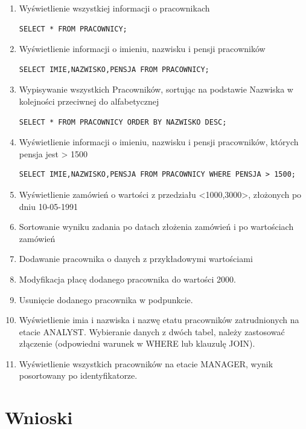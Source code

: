 \documentclass[a4paper, 10pt]{article}
\begin{document}
\begin{enumerate}

\item  Wyświetlienie wszystkiej informacji o pracownikach 
\begin{lstlisting}[style=SQL, caption=\textit{Wyświetlenie informacji o pracownikach}]
SELECT * FROM PRACOWNICY;
\end{lstlisting}

\item Wyświetlienie informacji o imieniu, nazwisku i pensji pracowników
\begin{lstlisting}[style=SQL, caption=\textit{Wyświetlenie imion, nazwisk i pensji pracowników}]
SELECT IMIE,NAZWISKO,PENSJA FROM PRACOWNICY;
\end{lstlisting}

\item Wypisywanie wszystkich Pracowników, sortując na podstawie Nazwiska w kolejności przeciwnej do alfabetycznej
\begin{lstlisting}[style=SQL, caption=\textit{Wypisywanie pracowników na podstawie nazwisk w kolejności przeciwnej do algabetycznej}]
SELECT * FROM PRACOWNICY ORDER BY NAZWISKO DESC;
\end{lstlisting}

\item Wyświetlienie informacji o imieniu, nazwisku i pensji pracowników, których pensja jest > 1500
\begin{lstlisting}[style=SQL, caption=\textit{Wyświetlenie informacji o imieniu, nazwisku i pensji pracowników których pensja jest > 1500}]
SELECT IMIE,NAZWISKO,PENSJA FROM PRACOWNICY WHERE PENSJA > 1500;
\end{lstlisting}

\item Wyświetlienie zamówień o wartości z przedziału <1000,3000>, złożonych po dniu 10-05-1991

\item Sortowanie wyniku zadania po datach złożenia zamówień i po wartościach zamówień

\item Dodawanie pracownika o danych z przykładowymi wartościami

\item Modyfikacja płacę dodanego pracownika do wartości 2000. 

\item Usunięcie dodanego pracownika w podpunkcie. 

\item Wyświetlienie imia i nazwiska i nazwę etatu pracowników zatrudnionych na etacie  ANALYST. Wybieranie danych z dwóch tabel, należy zastosować złączenie (odpowiedni warunek w WHERE lub klauzulę JOIN). 

\item Wyświetlienie wszystkich pracowników na etacie MANAGER, wynik posortowany po identyfikatorze.

\end{enumerate}

\section{Wnioski}
\end{document}
